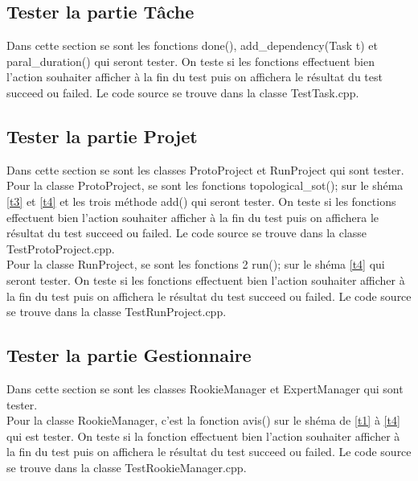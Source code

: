 \documentclass[paper=a4, fontsize=11pt, frenchb, englishb]{article}
\begin{document}
		\subsection{Tester la partie Tâche}
		
Dans cette section se sont les fonctions done(), add\_dependency(Task t) et paral\_duration() qui seront tester. On teste si les fonctions effectuent bien l'action souhaiter afficher à la fin du test puis on affichera le résultat du test succeed ou failed. Le code source se trouve dans la classe TestTask.cpp.
		
		\subsection{Tester la partie Projet}
	
Dans cette section se sont les classes ProtoProject et RunProject qui sont tester.\\
	
\noindent Pour la classe ProtoProject, se sont les fonctions topological\_sot(); sur le shéma \ref{t3} et \ref{t4} et les trois méthode add() qui seront tester. On teste si les fonctions effectuent bien l'action souhaiter afficher à la fin du test puis on affichera le résultat du test succeed ou failed. Le code source se trouve dans la classe TestProtoProject.cpp.\\

\noindent Pour la classe RunProject, se sont les fonctions 2 run(); sur le shéma \ref{t4} qui seront tester. On teste si les fonctions effectuent bien l'action souhaiter afficher à la fin du test puis on affichera le résultat du test succeed ou failed. Le code source se trouve dans la classe TestRunProject.cpp.
		
		\subsection{Tester la partie Gestionnaire}
		
Dans cette section se sont les classes RookieManager et ExpertManager qui sont tester.\\

\noindent Pour la classe RookieManager, c'est la fonction avis() sur le shéma de \ref{t1} à \ref{t4}  qui est tester. On teste si la fonction effectuent bien l'action souhaiter afficher à la fin du test puis on affichera le résultat du test succeed ou failed. Le code source se trouve dans la classe TestRookieManager.cpp.\\
\end{document}
